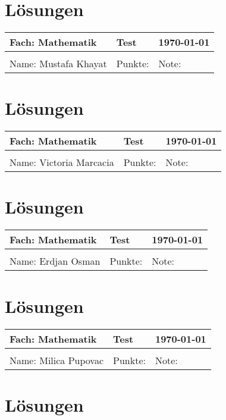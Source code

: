 \documentclass{article}%
\begin{document}
\section*{Lösungen}%
%
\newpage

%
\begin{tabular}{|p{5cm}|p{5cm}|p{5cm}|}%
\hline%
Fach: Mathematik&Test&\today\\%
\hline%
&&\\%
Name: Mustafa Khayat&Punkte: &Note: \\%
\hline%
\end{tabular}%
%
\section*{Lösungen}%
%
\newpage

%
\begin{tabular}{|p{5cm}|p{5cm}|p{5cm}|}%
\hline%
Fach: Mathematik&Test&\today\\%
\hline%
&&\\%
Name: Victoria Marcacia&Punkte: &Note: \\%
\hline%
\end{tabular}%
%
\section*{Lösungen}%
%
\newpage

%
\begin{tabular}{|p{5cm}|p{5cm}|p{5cm}|}%
\hline%
Fach: Mathematik&Test&\today\\%
\hline%
&&\\%
Name: Erdjan Osman&Punkte: &Note: \\%
\hline%
\end{tabular}%
%
\section*{Lösungen}%
%
\newpage

%
\begin{tabular}{|p{5cm}|p{5cm}|p{5cm}|}%
\hline%
Fach: Mathematik&Test&\today\\%
\hline%
&&\\%
Name: Milica Pupovac&Punkte: &Note: \\%
\hline%
\end{tabular}%
%
\section*{Lösungen}%
%
\newpage
\end{document}
